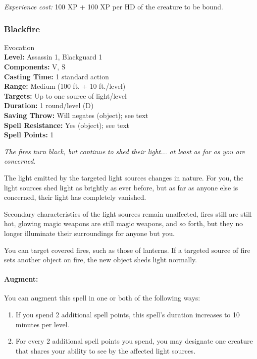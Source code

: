 \emph{Experience cost:} 100 XP + 100 XP per HD of the creature to be bound.
\subsubsection{Blackfire}
\label{Spell:Blackfire}
Evocation
\\ \textbf{Level:} Assassin 1, Blackguard 1
\\ \textbf{Components:} V, S
\\ \textbf{Casting Time:} 1 standard action
\\ \textbf{Range:} Medium (100 ft. + 10 ft./level)
\\ \textbf{Targets:} Up to one source of light/level
\\ \textbf{Duration:} 1 round/level (D)
\\ \textbf{Saving Throw:} Will negates (object); see text
\\ \textbf{Spell Resistance:} Yes (object); see text
\\ \textbf{Spell Points:} 1

\emph{The fires turn black, but continue to shed their light... at least as far as you are concerned.}

The light emitted by the targeted light sources changes in nature.
For you, the light sources shed light as brightly as ever before, but as far as anyone else is concerned, their light has completely vanished.

Secondary characteristics of the light sources remain unaffected, fires still are still hot, glowing magic weapons are still magic weapons, and so forth, but they no longer illuminate their surroundings for anyone but you.

You can target covered fires, such as those of lanterns. If a targeted source of fire sets another object on fire, the new object sheds light normally.

\paragraph{Augment:} You can augment this spell in one or both of the following ways:
\begin{enumerate}
 \item If you spend 2 additional spell points, this spell's duration increases to 10 minutes per level.
 \item For every 2 additional spell points you spend, you may designate one creature that shares your ability to see by the affected light sources.
\end{enumerate}
